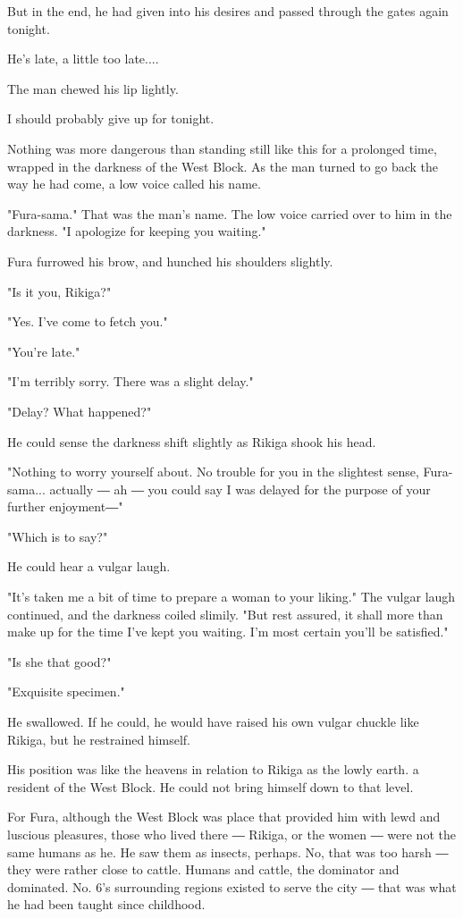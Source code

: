 But in the end, he had given into his desires and passed through the
gates again tonight.

He's late, a little too late....

The man chewed his lip lightly.

I should probably give up for tonight.

Nothing was more dangerous than standing still like this for a prolonged
time, wrapped in the darkness of the West Block. As the man turned to go
back the way he had come, a low voice called his name.

"Fura-sama." That was the man's name. The low voice carried over to him
in the darkness. "I apologize for keeping you waiting."

Fura furrowed his brow, and hunched his shoulders slightly.

"Is it you, Rikiga?"

"Yes. I've come to fetch you."

"You're late."

"I'm terribly sorry. There was a slight delay."

"Delay? What happened?"

He could sense the darkness shift slightly as Rikiga shook his head.

"Nothing to worry yourself about. No trouble for you in the slightest
sense, Fura-sama... actually ― ah ― you could say I was delayed for the
purpose of your further enjoyment―"

"Which is to say?"

He could hear a vulgar laugh.

"It's taken me a bit of time to prepare a woman to your liking." The
vulgar laugh continued, and the darkness coiled slimily. "But rest
assured, it shall more than make up for the time I've kept you waiting.
I'm most certain you'll be satisfied."

"Is she that good?"

"Exquisite specimen."

He swallowed. If he could, he would have raised his own vulgar chuckle
like Rikiga, but he restrained himself.

His position was like the heavens in relation to Rikiga as the lowly
earth. a resident of the West Block. He could not bring himself down to
that level.

For Fura, although the West Block was place that provided him with lewd
and luscious pleasures, those who lived there ― Rikiga, or the women ―
were not the same humans as he. He saw them as insects, perhaps. No,
that was too harsh ― they were rather close to cattle. Humans and
cattle, the dominator and dominated. No. 6's surrounding regions existed
to serve the city ― that was what he had been taught since childhood.

